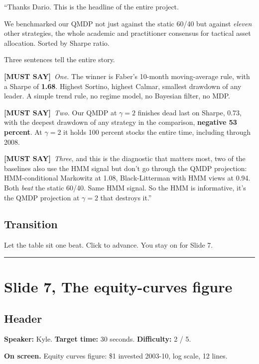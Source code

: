 \documentclass[11pt]{article}
\newcommand{\mustsay}[1]{\textcolor{must}{\textbf{[MUST SAY]}}\ #1}
\begin{document}
``Thanks Dario. This is the headline of the entire project.

We benchmarked our QMDP not just against the static 60/40 but against \emph{eleven} other strategies, the whole academic and practitioner consensus for tactical asset allocation. Sorted by Sharpe ratio.

Three sentences tell the entire story.

\mustsay{\emph{One.} The winner is Faber's 10-month moving-average rule, with a Sharpe of \textbf{1.68}. Highest Sortino, highest Calmar, smallest drawdown of any leader. A simple trend rule, no regime model, no Bayesian filter, no MDP.}

\mustsay{\emph{Two.} Our QMDP at $\gamma = 2$ finishes dead last on Sharpe, 0.73, with the deepest drawdown of any strategy in the comparison, \textbf{negative 53 percent}. At $\gamma = 2$ it holds 100 percent stocks the entire time, including through 2008.}

\mustsay{\emph{Three}, and this is the diagnostic that matters most, two of the baselines also use the HMM signal but don't go through the QMDP projection: HMM-conditional Markowitz at 1.08, Black-Litterman with HMM views at 0.94. Both \emph{beat} the static 60/40. Same HMM signal. So the HMM is informative, it's the QMDP projection at $\gamma = 2$ that destroys it.''}

\subsection*{Transition}

Let the table sit one beat. Click to advance. You stay on for Slide 7.

\bigskip\hrule

\section*{Slide 7, The equity-curves figure}

\subsection*{Header}

\textbf{Speaker:} Kyle. \quad\textbf{Target time:} 30 seconds. \quad\textbf{Difficulty:} 2 / 5.

\textbf{On screen.} Equity curves figure: \$1 invested 2003-10, log scale, 12 lines.
\end{document}
